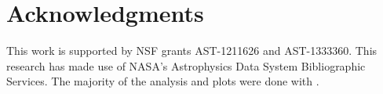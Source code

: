 \documentclass[useAMS,usenatbib]{mn2e}
\begin{document}
\section*{Acknowledgments}

This work is supported by NSF grants AST-1211626 and AST-1333360.
This research has made use of NASA's Astrophysics Data System
Bibliographic Services.  The majority of the analysis and plots were
done with \yt \citep{yt_full_paper}.


\bsp
\label{lastpage}
\end{document}
